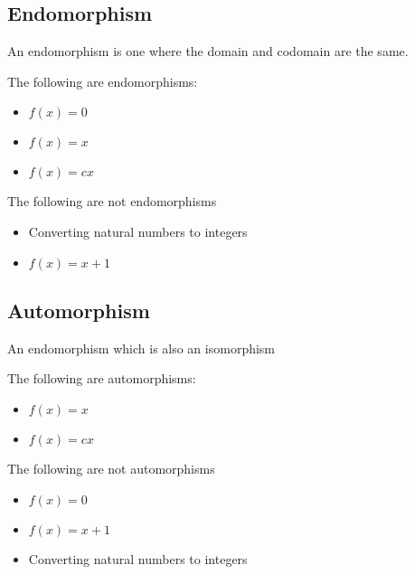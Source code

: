 
\subsection{Endomorphism}

An endomorphism is one where the domain and codomain are the same.

The following are endomorphisms:

\begin{itemize}
\item \(f(x)=0\)
\item \(f(x)=x\)
\item \(f(x)=cx\)
\end{itemize}

The following are not endomorphisms

\begin{itemize}
\item Converting natural numbers to integers
\item \(f(x)=x+1\)
\end{itemize}

\subsection{Automorphism}

An endomorphism which is also an isomorphism

The following are automorphisms:
\begin{itemize}
\item \(f(x)=x\)
\item \(f(x)=cx\)
\end{itemize}

The following are not automorphisms

\begin{itemize}
\item \(f(x)=0\)
\item \(f(x)=x+1\)
\item Converting natural numbers to integers
\end{itemize}


